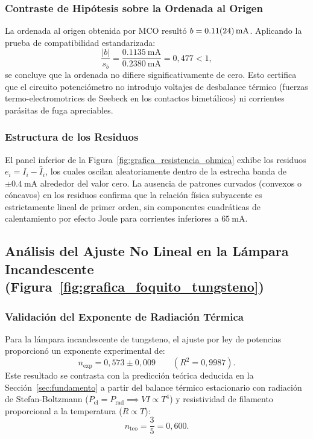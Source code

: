 \subsubsection{Contraste de Hipótesis sobre la Ordenada al Origen}
La ordenada al origen obtenida por MCO resultó $b = \qty{0,11 \pm 0,24}{\milli\ampere}$. Aplicando la prueba de compatibilidad estandarizada:
\begin{equation}
    \frac{|b|}{s_b} = \frac{\qty{0,1135}{\milli\ampere}}{\qty{0,2380}{\milli\ampere}} = 0{,}477 < 1,
\end{equation}
se concluye que la ordenada no difiere significativamente de cero. Esto certifica que el circuito potenciómetro no introdujo voltajes de desbalance térmico (fuerzas termo-electromotrices de Seebeck en los contactos bimetálicos) ni corrientes parásitas de fuga apreciables.

\subsubsection{Estructura de los Residuos}
El panel inferior de la Figura~\ref{fig:grafica_resistencia_ohmica} exhibe los residuos $e_i = I_i - \hat{I}_i$, los cuales oscilan aleatoriamente dentro de la estrecha banda de $\pm\qty{0,4}{\milli\ampere}$ alrededor del valor cero. La ausencia de patrones curvados (convexos o cóncavos) en los residuos confirma que la relación física subyacente es estrictamente lineal de primer orden, sin componentes cuadráticas de calentamiento por efecto Joule para corrientes inferiores a $\qty{65}{\milli\ampere}$.

\subsection{Análisis del Ajuste No Lineal en la Lámpara Incandescente (Figura~\ref{fig:grafica_foquito_tungsteno})}
\subsubsection{Validación del Exponente de Radiación Térmica}
Para la lámpara incandescente de tungsteno, el ajuste por ley de potencias proporcionó un exponente experimental de:
\begin{equation}
    n_{\text{exp}} = 0{,}573 \pm 0{,}009 \qquad (R^2 = 0{,}9987).
\end{equation}
Este resultado se contrasta con la predicción teórica deducida en la Sección~\ref{sec:fundamento} a partir del balance térmico estacionario con radiación de Stefan-Boltzmann ($P_{\text{el}} = P_{\text{rad}} \implies V I \propto T^4$) y resistividad de filamento proporcional a la temperatura ($R \propto T$):
\begin{equation}
    n_{\text{teo}} = \frac{3}{5} = 0{,}600.
\end{equation}

